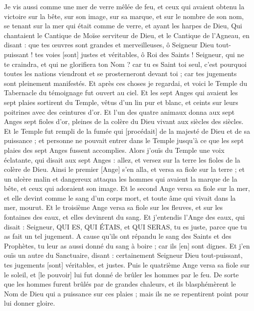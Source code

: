 \begin{multicols}{2}
Je vis aussi comme une mer de verre mêlée de feu, et ceux qui avaient obtenu la victoire sur la bête, sur son image, sur sa marque, et sur le nombre de son nom, se tenant sur la mer qui était comme de verre, et ayant les harpes de Dieu,
Qui chantaient le Cantique de Moïse serviteur de Dieu, et le Cantique de l'Agneau, en disant : que tes œuvres sont grandes et merveilleuses, ô Seigneur Dieu tout-puissant ! tes voies [sont] justes et véritables, ô Roi des Saints !
Seigneur, qui ne te craindra, et qui ne glorifiera ton Nom ? car tu es Saint toi seul, c'est pourquoi toutes les nations viendront et se prosterneront devant toi ; car tes jugements sont pleinement manifestés.
Et après ces choses je regardai, et voici le Temple du Tabernacle du témoignage fut ouvert au ciel.
Et les sept Anges qui avaient les sept plaies sortirent du Temple, vêtus d'un lin pur et blanc, et ceints sur leurs poitrines avec des ceintures d'or.
Et l'un des quatre animaux donna aux sept Anges sept fioles d'or, pleines de la colère du Dieu vivant aux siècles des siècles.
Et le Temple fut rempli de la fumée qui [procédait] de la majesté de Dieu et de sa puissance ; et personne ne pouvait entrer dans le Temple jusqu'à ce que les sept plaies des sept Anges fussent accomplies.
\VerseOne{}Alors j'ouïs du Temple une voix éclatante, qui disait aux sept Anges : allez, et versez sur la terre les fioles de la colère de Dieu.
Ainsi le premier [Ange] s'en alla, et versa sa fiole sur la terre ; et un ulcère malin et dangereux attaqua les hommes qui avaient la marque de la bête, et ceux qui adoraient son image.
Et le second Ange versa sa fiole sur la mer, et elle devint comme le sang d'un corps mort, et toute âme qui vivait dans la mer, mourut.
Et le troisième Ange versa sa fiole sur les fleuves, et sur les fontaines des eaux, et elles devinrent du sang.
Et j'entendis l'Ange des eaux, qui disait : Seigneur, QUI ES, QUI ÉTAIS, et QUI SERAS, tu es juste, parce que tu as fait un tel jugement.
A cause qu'ils ont répandu le sang des Saints et des Prophètes, tu leur as aussi donné du sang à boire ; car ils [en] sont dignes.
Et j'en ouïs un autre du Sanctuaire, disant : certainement Seigneur Dieu tout-puissant, tes jugements [sont] véritables, et justes.
Puis le quatrième Ange versa sa fiole sur le soleil, et [le pouvoir] lui fut donné de brûler les hommes par le feu.
De sorte que les hommes furent brûlés par de grandes chaleurs, et ils blasphémèrent le Nom de Dieu qui a puissance sur ces plaies ; mais ils ne se repentirent point pour lui donner gloire.

\end{multicols}
